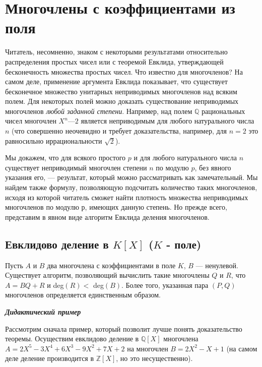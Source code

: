\section{Многочлены с коэффициентами из поля}
Читатель, несомненно, знаком с некоторыми результатами  
относительно распределения простых чисел или с теоремой Евклида,  
утверждающей бесконечность множества простых чисел. Что известно для  
многочленов? На самом деле, применение аргумента Евклида  
показывает, что существует бесконечное множество унитарных неприводимых 
многочленов над всяким полем. Для некоторых полей можно доказать 
существование неприводимых многочленов \textit{любой заданной степени}. 
Например, над полем $\mathbb{Q}$ рациональных чисел многочлен $X^n — 2$  
является неприводимым для любого натурального числа $n$ (что совершенно 
неочевидно и требует доказательства, например, для $n = 2$ это  
равносильно иррациональности $\sqrt{2}$). 

Мы докажем, что для всякого простого $p$ и для любого  
натурального числа $n$ существует неприводимый многочлен степени $n$ по модулю 
$p$, без явного указания его, — результат, который можно  
рассматривать как замечательный. Мы найдем также формулу, позволяющую 
подсчитать количество таких многочленов, исходя из которой  
читатель сможет найти плотность множества неприводимых многочленов 
по модулю р, имеющих данную степень. Но прежде всего, представим 
в явном виде алгоритм Евклида деления многочленов. 
\pagebreak

\subsection{Евклидово деление в $K[X]$ ($K$ - поле)}

\begin{thm}
\hspace*{15pt}Пусть $A$ и $B$ два многочлена с коэффициентами в поле $K$, $B$ —  
ненулевой. Существует алгоритм, позволяющий вычислить такие  
многочлены $Q$ и $R$, что $A = BQ + R $ и deg$(R) < $ deg$(B)$. Более того, указанная 
пара $(P, Q)$ многочленов определяется единственным образом.
\end{thm}

\noindent\textbf{\textit{Дидактический пример}}

Рассмотрим сначала пример, который позволит лучше понять  
доказательство теоремы. Осуществим евклидово деление в $\mathbb{Q}[X]$ многочлена\linebreak 
$A = 2X^5 - 3X^4 + 6X^3 - 9X^2 + 7X + 2$ на многочлен $B = 2X^2 - X + 1$ 
(на самом деле деление производится в $\mathbb{Z}[X]$, но это несущественно). 

